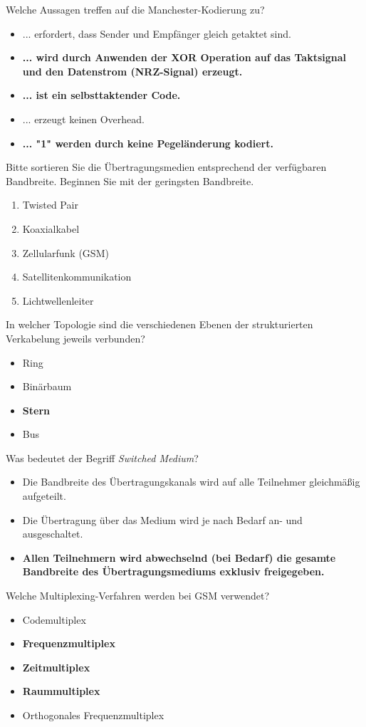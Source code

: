 \documentclass{article}
\begin{document}
	Welche Aussagen treffen auf die Manchester-Kodierung zu? 
	\begin{itemize}
		\item ... erfordert, dass Sender und Empfänger gleich getaktet sind.
		\item \textbf{... wird durch Anwenden der XOR Operation auf das Taktsignal und den Datenstrom (NRZ-Signal) erzeugt.}
		\item \textbf{... ist ein selbsttaktender Code.}
		\item ... erzeugt keinen Overhead.
		\item \textbf{... "1" werden durch keine Pegeländerung kodiert.}
	\end{itemize}

	Bitte sortieren Sie die Übertragungsmedien entsprechend der verfügbaren Bandbreite. Beginnen Sie mit der geringsten Bandbreite. 
	\begin{enumerate}
		\item Twisted Pair
		\item Koaxialkabel
		\item Zellularfunk (GSM)
		\item Satellitenkommunikation
		\item Lichtwellenleiter
	\end{enumerate}

	In welcher Topologie sind die verschiedenen Ebenen der strukturierten Verkabelung jeweils verbunden? 
	\begin{itemize}
		\item Ring
		\item Binärbaum
		\item \textbf{Stern}
		\item Bus
	\end{itemize}

	Was bedeutet der Begriff \textit{Switched Medium}?
	\begin{itemize}
		\item Die Bandbreite des Übertragungskanals wird auf alle Teilnehmer gleichmäßig aufgeteilt. 
		\item Die Übertragung über das Medium wird je nach Bedarf an- und ausgeschaltet. 
		\item \textbf{Allen Teilnehmern wird abwechselnd (bei Bedarf) die gesamte Bandbreite des Übertragungsmediums exklusiv freigegeben. }
	\end{itemize}

	Welche Multiplexing-Verfahren werden bei GSM verwendet? 
	\begin{itemize}
		\item Codemultiplex
		\item \textbf{Frequenzmultiplex}
		\item \textbf{Zeitmultiplex}
		\item \textbf{Raummultiplex}
		\item Orthogonales Frequenzmultiplex
	\end{itemize}
\end{document}

